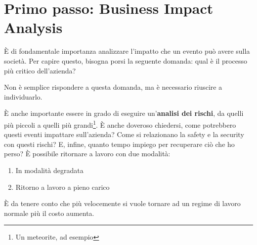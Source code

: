 \section{Primo passo: Business Impact Analysis}

È di fondamentale importanza analizzare l'impatto che un evento può avere sulla
società. Per capire questo, bisogna porsi la seguente domanda: qual è il
processo più critico dell'azienda?

Non è semplice rispondere a questa domanda, ma è necessario riuscire a
individuarlo.

È anche importante essere in grado di eseguire un'\textbf{analisi dei rischi},
da quelli più piccoli a quelli più grandi\footnote{Un meteorite, ad esempio}. È
anche doveroso chiedersi, come potrebbero questi eventi impattare sull'azienda?
Come si relazionano la safety e la security con questi rischi? E, infine,
quanto tempo impiego per recuperare ciò che ho perso? È possibile ritornare a
lavoro con due modalità:
\begin{enumerate}
  \item In modalità degradata
  \item Ritorno a lavoro a pieno carico
\end{enumerate}

È da tenere conto che più velocemente si vuole tornare ad un regime di lavoro
normale più il costo aumenta.
